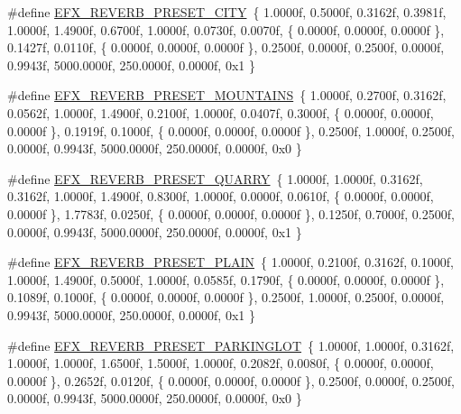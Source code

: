 \begin{DoxyCompactItemize}
\item 
\#define \hyperlink{efx-presets_8h_acc2f97a2e86723624bff8abd909ddc0c}{E\+F\+X\+\_\+\+R\+E\+V\+E\+R\+B\+\_\+\+P\+R\+E\+S\+E\+T\+\_\+\+C\+I\+TY}~\{ 1.\+0000f, 0.\+5000f, 0.\+3162f, 0.\+3981f, 1.\+0000f, 1.\+4900f, 0.\+6700f, 1.\+0000f, 0.\+0730f, 0.\+0070f, \{ 0.\+0000f, 0.\+0000f, 0.\+0000f \}, 0.\+1427f, 0.\+0110f, \{ 0.\+0000f, 0.\+0000f, 0.\+0000f \}, 0.\+2500f, 0.\+0000f, 0.\+2500f, 0.\+0000f, 0.\+9943f, 5000.\+0000f, 250.\+0000f, 0.\+0000f, 0x1 \}
\item 
\#define \hyperlink{efx-presets_8h_a01a4fbb51046564e360a027fb499f26e}{E\+F\+X\+\_\+\+R\+E\+V\+E\+R\+B\+\_\+\+P\+R\+E\+S\+E\+T\+\_\+\+M\+O\+U\+N\+T\+A\+I\+NS}~\{ 1.\+0000f, 0.\+2700f, 0.\+3162f, 0.\+0562f, 1.\+0000f, 1.\+4900f, 0.\+2100f, 1.\+0000f, 0.\+0407f, 0.\+3000f, \{ 0.\+0000f, 0.\+0000f, 0.\+0000f \}, 0.\+1919f, 0.\+1000f, \{ 0.\+0000f, 0.\+0000f, 0.\+0000f \}, 0.\+2500f, 1.\+0000f, 0.\+2500f, 0.\+0000f, 0.\+9943f, 5000.\+0000f, 250.\+0000f, 0.\+0000f, 0x0 \}
\item 
\#define \hyperlink{efx-presets_8h_a75ff37a6a3dba17f608feecd3e3b7a3f}{E\+F\+X\+\_\+\+R\+E\+V\+E\+R\+B\+\_\+\+P\+R\+E\+S\+E\+T\+\_\+\+Q\+U\+A\+R\+RY}~\{ 1.\+0000f, 1.\+0000f, 0.\+3162f, 0.\+3162f, 1.\+0000f, 1.\+4900f, 0.\+8300f, 1.\+0000f, 0.\+0000f, 0.\+0610f, \{ 0.\+0000f, 0.\+0000f, 0.\+0000f \}, 1.\+7783f, 0.\+0250f, \{ 0.\+0000f, 0.\+0000f, 0.\+0000f \}, 0.\+1250f, 0.\+7000f, 0.\+2500f, 0.\+0000f, 0.\+9943f, 5000.\+0000f, 250.\+0000f, 0.\+0000f, 0x1 \}
\item 
\#define \hyperlink{efx-presets_8h_a4f25fa872d6ae85b7013d23b31ab7852}{E\+F\+X\+\_\+\+R\+E\+V\+E\+R\+B\+\_\+\+P\+R\+E\+S\+E\+T\+\_\+\+P\+L\+A\+IN}~\{ 1.\+0000f, 0.\+2100f, 0.\+3162f, 0.\+1000f, 1.\+0000f, 1.\+4900f, 0.\+5000f, 1.\+0000f, 0.\+0585f, 0.\+1790f, \{ 0.\+0000f, 0.\+0000f, 0.\+0000f \}, 0.\+1089f, 0.\+1000f, \{ 0.\+0000f, 0.\+0000f, 0.\+0000f \}, 0.\+2500f, 1.\+0000f, 0.\+2500f, 0.\+0000f, 0.\+9943f, 5000.\+0000f, 250.\+0000f, 0.\+0000f, 0x1 \}
\item 
\#define \hyperlink{efx-presets_8h_a92af074540f1cef1a1831574abd23511}{E\+F\+X\+\_\+\+R\+E\+V\+E\+R\+B\+\_\+\+P\+R\+E\+S\+E\+T\+\_\+\+P\+A\+R\+K\+I\+N\+G\+L\+OT}~\{ 1.\+0000f, 1.\+0000f, 0.\+3162f, 1.\+0000f, 1.\+0000f, 1.\+6500f, 1.\+5000f, 1.\+0000f, 0.\+2082f, 0.\+0080f, \{ 0.\+0000f, 0.\+0000f, 0.\+0000f \}, 0.\+2652f, 0.\+0120f, \{ 0.\+0000f, 0.\+0000f, 0.\+0000f \}, 0.\+2500f, 0.\+0000f, 0.\+2500f, 0.\+0000f, 0.\+9943f, 5000.\+0000f, 250.\+0000f, 0.\+0000f, 0x0 \}
\item 

\end{DoxyCompactItemize}
